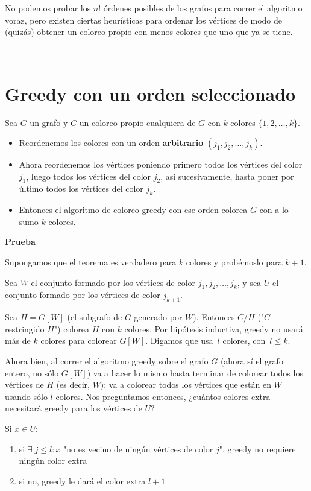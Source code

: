 \documentclass[10pt,a4paper]{article}
\begin{document}
No podemos probar los $n!$ órdenes posibles de los grafos para correr el algoritmo voraz, pero existen ciertas heurísticas para ordenar los vértices de modo de (quizás) obtener un coloreo propio con menos colores que uno que ya se tiene.

 

\section*{Greedy con un orden seleccionado}

Sea $G$ un grafo y $C$ un coloreo propio cualquiera de $G$ con $k$ colores $\{1, 2, \dots, k\}$.

\begin{itemize}

	\item Reordenemos los colores con un orden \textbf{arbitrario} $(j_1, j_2, \dots, j_k)$.
	\item Ahora reordenemos los vértices poniendo primero todos los vértices del color $j_1$, luego todos los vértices del color $j_2$, así sucesivamente, hasta poner por último todos los vértices del color $j_k$.
	\item Entonces el algoritmo de coloreo greedy con ese orden colorea $G$ con a lo sumo $k$ colores.
\end{itemize}

\textbf{Prueba}

Supongamos que el teorema es verdadero para $k$ colores y probémoslo para $k + 1$.

Sea $W$ el conjunto formado por los vértices de color $j_1, j_2, \dots, j_k$, y sea $U$ el conjunto formado por los vértices de color $j_{k+1}$.

Sea $H = G[W]$ (el subgrafo de $G$ generado por $W$). Entonces $C/H$ ("$C$ restringido $H$") colorea $H$ con $k$ colores. Por hipótesis inductiva, greedy no usará más de $k$ colores para colorear $G[W]$. Digamos que usa $l$ colores, con $l \leq k$.

Ahora bien, al correr el algoritmo greedy sobre el grafo $G$ (ahora sí el grafo entero, no sólo $G[W]$) va a hacer lo mismo hasta terminar de colorear todos los vértices de $H$ (es decir, $W)$: va a colorear todos los vértices que están en $W$ usando sólo $l$ colores. Nos preguntamos entonces, ¿cuántos colores extra necesitará greedy para los vértices de $U$?

Si $x \in U$:

\begin{enumerate}

	\item si $\exists \;j \leq l : x$ "no es vecino de ningún vértices de color $j$", greedy no requiere ningún color extra
	\item si no, greedy le dará el color extra $l + 1$
\end{enumerate}
\end{document}
